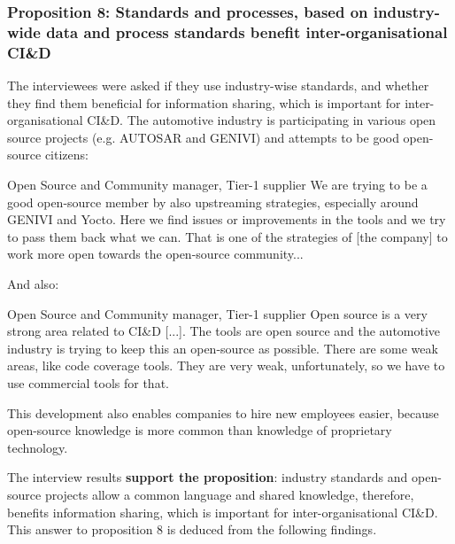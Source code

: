 \vspace{.2cm}
\subsubsection{Proposition 8: Standards and processes, based on industry-wide data and process standards benefit inter-organisational CI\&D}

The interviewees were asked if they use industry-wise standards, and whether they find them beneficial for information sharing, which is important for inter-organisational CI\&D. The automotive industry is participating in various open source projects (e.g. AUTOSAR and GENIVI) and attempts to be good open-source citizens:

\begin{aquote}{Open Source and Community manager, Tier-1 supplier}
We are trying to be a good open-source member by also upstreaming strategies, especially around GENIVI and Yocto. Here we find issues or improvements in the tools and we try to pass them back what we can. That is one of the strategies of [the company] to work more open towards the open-source community...%
\end{aquote}

And also:

\begin{aquote}{Open Source and Community manager, Tier-1 supplier}
Open source is a very strong area related to CI\&D [...]. The tools are open source and the automotive industry is trying to keep this an open-source as possible. There are some weak areas, like code coverage tools. They are very weak, unfortunately, so we have to use commercial tools for that.
\end{aquote}

This development also enables companies to hire new employees easier, because open-source knowledge is more common than knowledge of proprietary technology.


The interview results {\bf support the proposition}: industry standards and open-source projects allow a common language and shared knowledge, therefore, benefits information sharing, which is important for inter-organisational CI\&D. This answer to proposition 8 is deduced from the following findings.

